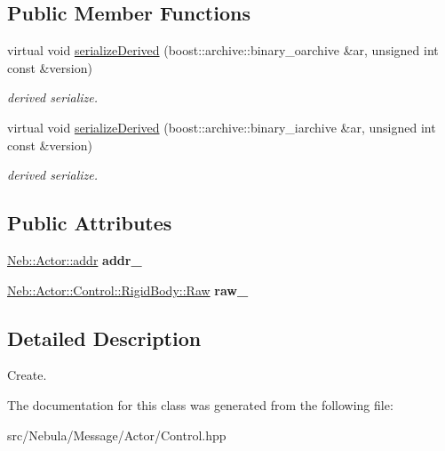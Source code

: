 \subsection*{\-Public \-Member \-Functions}
\begin{DoxyCompactItemize}
\item 
\hypertarget{classNeb_1_1Message_1_1Actor_1_1Control_1_1RigidBody_1_1Create_aa390bc059f2eea71aed8d255faf23509}{virtual void \hyperlink{classNeb_1_1Message_1_1Actor_1_1Control_1_1RigidBody_1_1Create_aa390bc059f2eea71aed8d255faf23509}{serialize\-Derived} (boost\-::archive\-::binary\-\_\-oarchive \&ar, unsigned int const \&version)}\label{classNeb_1_1Message_1_1Actor_1_1Control_1_1RigidBody_1_1Create_aa390bc059f2eea71aed8d255faf23509}

\begin{DoxyCompactList}\small\item\em derived serialize. \end{DoxyCompactList}\item 
\hypertarget{classNeb_1_1Message_1_1Actor_1_1Control_1_1RigidBody_1_1Create_a6784429360fa42e6146a696d7e164731}{virtual void \hyperlink{classNeb_1_1Message_1_1Actor_1_1Control_1_1RigidBody_1_1Create_a6784429360fa42e6146a696d7e164731}{serialize\-Derived} (boost\-::archive\-::binary\-\_\-iarchive \&ar, unsigned int const \&version)}\label{classNeb_1_1Message_1_1Actor_1_1Control_1_1RigidBody_1_1Create_a6784429360fa42e6146a696d7e164731}

\begin{DoxyCompactList}\small\item\em derived serialize. \end{DoxyCompactList}\end{DoxyCompactItemize}
\subsection*{\-Public \-Attributes}
\begin{DoxyCompactItemize}
\item 
\hypertarget{classNeb_1_1Message_1_1Actor_1_1Control_1_1RigidBody_1_1Create_a1c3a2b0c8916e45b385489c1ae2720c8}{\hyperlink{classNeb_1_1Actor_1_1addr}{\-Neb\-::\-Actor\-::addr} {\bfseries addr\-\_\-}}\label{classNeb_1_1Message_1_1Actor_1_1Control_1_1RigidBody_1_1Create_a1c3a2b0c8916e45b385489c1ae2720c8}

\item 
\hypertarget{classNeb_1_1Message_1_1Actor_1_1Control_1_1RigidBody_1_1Create_a14e77739ef573690efb085293bd3a4f8}{\hyperlink{classNeb_1_1Actor_1_1Control_1_1RigidBody_1_1Raw}{\-Neb\-::\-Actor\-::\-Control\-::\-Rigid\-Body\-::\-Raw} {\bfseries raw\-\_\-}}\label{classNeb_1_1Message_1_1Actor_1_1Control_1_1RigidBody_1_1Create_a14e77739ef573690efb085293bd3a4f8}

\end{DoxyCompactItemize}


\subsection{\-Detailed \-Description}
\-Create. 

\-The documentation for this class was generated from the following file\-:\begin{DoxyCompactItemize}
\item 
src/\-Nebula/\-Message/\-Actor/\-Control.\-hpp\end{DoxyCompactItemize}

